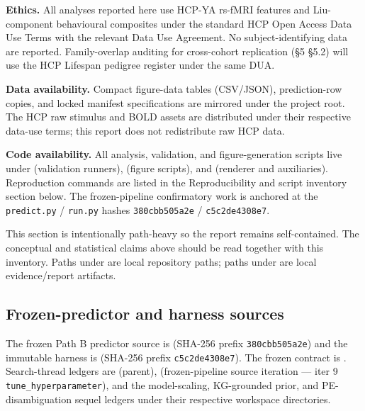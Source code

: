 \documentclass[11pt,letterpaper]{report}
\begin{document}

\textbf{Ethics.} All analyses reported here use HCP-YA rs-fMRI features and Liu-component behavioural composites under the standard HCP Open Access Data Use Terms with the relevant Data Use Agreement. No subject-identifying data are reported. Family-overlap auditing for cross-cohort replication (\S5 \S5.2) will use the HCP Lifespan pedigree register under the same DUA.

\textbf{Data availability.} Compact figure-data tables (CSV/JSON), prediction-row copies, and locked manifest specifications are mirrored under the project root. The HCP raw stimulus and BOLD assets are distributed under their respective data-use terms; this report does not redistribute raw HCP data.

\textbf{Code availability.} All analysis, validation, and figure-generation scripts live under  (validation runners),  (figure scripts), and  (renderer and auxiliaries). Reproduction commands are listed in the Reproducibility and script inventory section below. The frozen-pipeline confirmatory work is anchored at the \texttt{predict.py} / \texttt{run.py} hashes \texttt{380cbb505a2e} / \texttt{c5c2de4308e7}.



This section is intentionally path-heavy so the report remains self-contained. The conceptual and statistical claims above should be read together with this inventory. Paths under  are local repository paths; paths under  are local evidence/report artifacts.

\subsection*{Frozen-predictor and harness sources}

The frozen Path B predictor source is  (SHA-256 prefix \texttt{380cbb505a2e}) and the immutable harness is  (SHA-256 prefix \texttt{c5c2de4308e7}). The frozen contract is . Search-thread ledgers are  (parent),  (frozen-pipeline source iteration --- iter 9 \texttt{tune\_hyperparameter}), and the model-scaling, KG-grounded prior, and PE-disambiguation sequel ledgers under their respective workspace directories.
\end{document}
